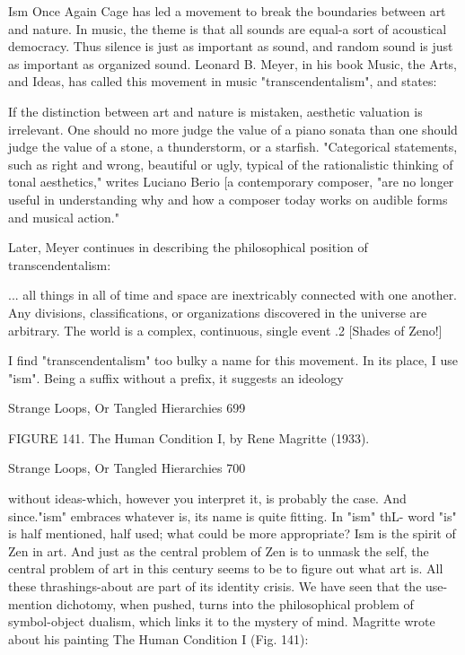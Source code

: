                                     Ism Once Again
Cage has led a movement to break the boundaries between art and nature. In music, the
theme is that all sounds are equal-a sort of acoustical democracy. Thus silence is just as
important as sound, and random sound is just as important as organized sound. Leonard
B. Meyer, in his book Music, the Arts, and Ideas, has called this movement in music
"transcendentalism", and states:

   If the distinction between art and nature is mistaken, aesthetic valuation is
   irrelevant. One should no more judge the value of a piano sonata than one should
   judge the value of a stone, a thunderstorm, or a starfish. "Categorical statements,
   such as right and wrong, beautiful or ugly, typical of the rationalistic thinking of
   tonal aesthetics," writes Luciano Berio [a contemporary composer, "are no longer
   useful in understanding why and how a composer today works on audible forms
   and musical action."

Later, Meyer continues in describing the philosophical position of transcendentalism:

           ... all things in all of time and space are inextricably connected with one
   another. Any divisions, classifications, or organizations discovered in the universe
   are arbitrary. The world is a complex, continuous, single event .2 [Shades of Zeno!]

       I find "transcendentalism" too bulky a name for this movement. In its place, I use
"ism". Being a suffix without a prefix, it suggests an ideology




Strange Loops, Or Tangled Hierarchies                                                    699

           FIGURE 141. The Human Condition I, by Rene Magritte (1933).




Strange Loops, Or Tangled Hierarchies                                    700

without ideas-which, however you interpret it, is probably the case. And since."ism"
embraces whatever is, its name is quite fitting. In "ism" thL- word "is" is half mentioned,
half used; what could be more appropriate? Ism is the spirit of Zen in art. And just as the
central problem of Zen is to unmask the self, the central problem of art in this century
seems to be to figure out what art is. All these thrashings-about are part of its identity
crisis.
        We have seen that the use-mention dichotomy, when pushed, turns into the
philosophical problem of symbol-object dualism, which links it to the mystery of mind.
Magritte wrote about his painting The Human Condition I (Fig. 141):


